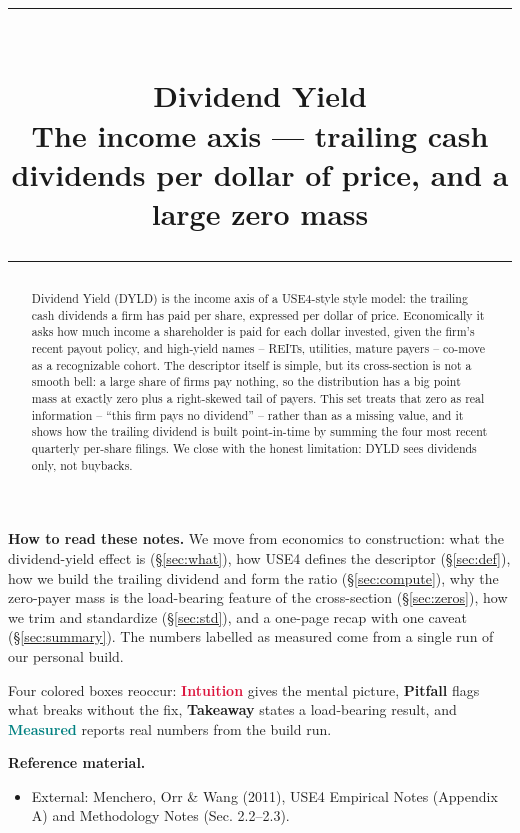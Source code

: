 \documentclass[11pt]{article}
\title{\vspace{-2.2em}
  {\color{steel}\rule{\textwidth}{1.3pt}}\\[0.7em]
  \Huge\bfseries Dividend Yield\\[0.35em]
  \large\mdseries The income axis --- trailing cash dividends per dollar of price, and a large zero mass\\[0.4em]
  {\color{steel}\rule{\textwidth}{0.7pt}}}
\author{}
\date{}
\theoremstyle{definition}
\theoremstyle{plain}
\theoremstyle{remark}
\begin{document}
\maketitle
\thispagestyle{empty}

\begin{abstract}
Dividend Yield (DYLD) is the income axis of a USE4-style style model: the trailing cash dividends a firm has paid per share, expressed per dollar of price. Economically it asks how much income a shareholder is paid for each dollar invested, given the firm's recent payout policy, and high-yield names -- REITs, utilities, mature payers -- co-move as a recognizable cohort. The descriptor itself is simple, but its cross-section is not a smooth bell: a large share of firms pay nothing, so the distribution has a big point mass at exactly zero plus a right-skewed tail of payers. This set treats that zero as real information -- ``this firm pays no dividend'' -- rather than as a missing value, and it shows how the trailing dividend is built point-in-time by summing the four most recent quarterly per-share filings. We close with the honest limitation: DYLD sees dividends only, not buybacks.
\end{abstract}

\begin{tcolorbox}[colback=paperlt,colframe=ink!30,boxrule=0.4pt,arc=2pt,left=10pt,right=10pt,top=8pt,bottom=8pt]
\textbf{How to read these notes.} We move from economics to construction: what the dividend-yield effect is (\S\ref{sec:what}), how USE4 defines the descriptor (\S\ref{sec:def}), how we build the trailing dividend and form the ratio (\S\ref{sec:compute}), why the zero-payer mass is the load-bearing feature of the cross-section (\S\ref{sec:zeros}), how we trim and standardize (\S\ref{sec:std}), and a one-page recap with one caveat (\S\ref{sec:summary}). The numbers labelled as measured come from a single run of our personal build.

Four colored boxes reoccur: \textcolor{crimson}{\textbf{Intuition}} gives the mental picture, \textcolor{amber}{\textbf{Pitfall}} flags what breaks without the fix, \textcolor{steel}{\textbf{Takeaway}} states a load-bearing result, and \textcolor{teal}{\textbf{Measured}} reports real numbers from the build run.

\textbf{Reference material.}
\begin{itemize}[leftmargin=1.4em,topsep=2pt]
  \item External: Menchero, Orr \& Wang (2011), USE4 Empirical Notes (Appendix A) and Methodology Notes (Sec. 2.2--2.3).
\end{itemize}
\end{tcolorbox}
\end{document}
